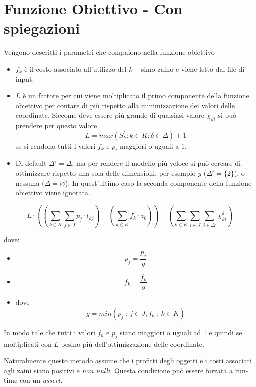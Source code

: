 \documentclass{scrartcl}
\begin{document}
\section{Funzione Obiettivo - Con spiegazioni}
Vengono descritti i parametri che compaiono nella funzione obiettivo
\begin{itemize}
	\item $f_k$ è il costo associato all'utilizzo del $k-$simo zaino e viene letto dal file di input.
	\item $L$ è un fattore per cui viene moltiplicato il primo componente della funzione obiettivo per contare
	di più rispetto alla minimizzazione dei valori delle coordinate.
	Siccome deve essere più grande di qualsiasi valore $\chi_{ki}$ si può prendere per questo valore
	$$
	L = max(S_{k}^\delta : k \in K : \delta \in \Delta) + 1
	$$
	se si rendono tutti i valori $f_k$ e $p_i$ maggiori o uguali a $1$.

	\item Di default $\Delta' = \Delta$, ma per rendere il modello più veloce si può cercare di ottimizzare rispetto una sola delle dimensioni, per esempio $y$ ($\Delta' = \{2\}$),	o nessuna ($\Delta = \varnothing$). In quest'ultimo caso
	la seconda componente della funzione obiettivo viene ignorata.
\end{itemize}


\begin{equation}
L \cdot \left(\left( \sum_{k \in K} \sum_{j \in J} \bar{p_{j}} \cdot t_{kj} \right) - \left( \sum_{k \in K} \bar{f_k} \cdot z_k \right) \right)
- \left( \sum_{k \in K}\sum_{i \in J}\sum_{\delta \in \Delta'} \chi_{ki}^\delta \right)
\end{equation}

dove:
\begin{itemize}
	\item $$\bar{p_{j}} = \frac{p_{j}}{g}$$
	\item $$\bar{f_{k}} = \frac{f_{k}}{g}$$
	\item dove 
	$$
	g = min(p_j\ :\ j \in J, f_k\ :\ k \in K)
	$$
\end{itemize}
In modo tale che tutti i valori $\bar{f_k}$ e $\bar{p_j}$ siano maggiori o uguali ad $1$ e quindi se moltiplicati
con $L$ pesino più dell'ottimizzazione delle coordinate.

Naturalmente questo metodo assume che i profitti degli oggetti e i costi associati agli zaini siano positivi e \emph{non nulli}.
Questa condizione può essere forzata a run-time con un \textit{assert}.
\end{document}

